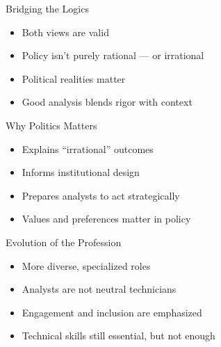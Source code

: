 \documentclass[10pt]{beamer}
\begin{document}
\begin{frame}{Bridging the Logics}

\begin{block}{}
    \begin{itemize}
        \item Both views are valid
        \item Policy isn't purely rational — or irrational
        \item Political realities matter
        \item Good analysis blends rigor with context
    \end{itemize}
\end{block}

\end{frame}


\begin{frame}{Why Politics Matters}

\begin{block}{}
    \begin{itemize}
        \item Explains “irrational” outcomes
        \item Informs institutional design
        \item Prepares analysts to act strategically
        \item Values and preferences matter in policy
    \end{itemize}
\end{block}

\end{frame}


\begin{frame}{Evolution of the Profession}

\begin{block}{}
    \begin{itemize}
        \item More diverse, specialized roles
        \item Analysts are not neutral technicians
        \item Engagement and inclusion are emphasized
        \item Technical skills still essential, but not enough
    \end{itemize}
\end{block}

\end{frame}
\end{document}
